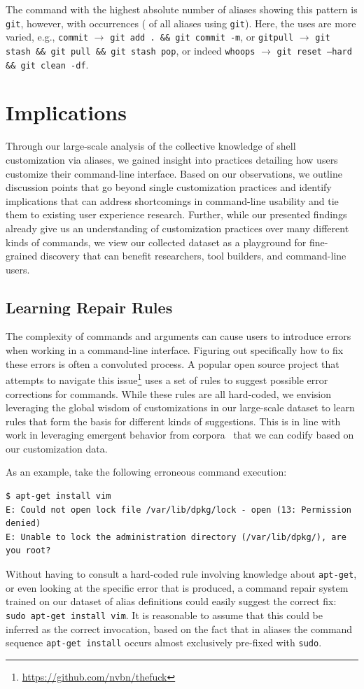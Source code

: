 \documentclass[smallextended,natbib]{svjour3}
\newcommand{\num}[1]{\numprint{#1}}
\newcommand{\per}[1]{\numprint[\%]{#1}}
\newcommand{\alias}[2]{{\texttt{#1} $\rightarrow$ \texttt{#2}}}
\newcommand{\cmd}[1]{{\texttt{#1}}}
\begin{document}
The command with the highest absolute number of aliases showing this pattern is \cmd{git}, however, with \num{12063} occurrences (\per{3.89} of all aliases using \cmd{git}).
Here, the uses are more varied, 
e.g., \alias{commit}{git add . \&\& git commit -m}, 
or \alias{gitpull}{git stash \&\& git pull \&\& git stash pop},
or indeed \alias{whoops}{git reset --hard \&\& git clean -df}.

\section{Implications}

Through our large-scale analysis of the collective knowledge of shell customization via aliases,
we gained insight into practices detailing how users customize their command-line interface.
Based on our observations, we outline discussion points that go beyond single customization practices and identify implications that can address shortcomings in command-line usability and tie them to existing user experience research.
Further, while our presented findings already give us an understanding of customization practices over many different kinds of commands, we view our collected dataset as a playground for fine-grained discovery that can benefit researchers, tool builders, and command-line users.

\subsection{Learning Repair Rules}
\label{sec:repair-rules}

The complexity of commands and arguments can cause users to introduce errors when working in a command-line interface.
Figuring out specifically how to fix these errors is often a convoluted process.
A popular open source project that attempts to navigate this issue\footnote{\url{https://github.com/nvbn/thefuck}} uses a set of rules to suggest possible error corrections for commands.
While these rules are all hard-coded, we envision leveraging the global wisdom of customizations in our large-scale dataset to learn rules that form the basis for different kinds of suggestions.
This is in line with work in leveraging emergent behavior from corpora~\citep{fast:14} that we can codify based on our customization data.

As an example, take the following erroneous command execution:
\begin{Verbatim}[breaklines=true]
$ apt-get install vim
E: Could not open lock file /var/lib/dpkg/lock - open (13: Permission denied)
E: Unable to lock the administration directory (/var/lib/dpkg/), are you root?
\end{Verbatim}
Without having to consult a hard-coded rule involving knowledge about \cmd{apt-get}, or even looking at the specific error that is produced, a command repair system trained on our dataset of alias definitions could easily suggest the correct fix: \texttt{sudo apt-get install vim}.
It is reasonable to assume that this could be inferred as the correct invocation, based on the fact that in aliases the command sequence \texttt{apt-get install} occurs almost exclusively pre-fixed with \cmd{sudo}.
\end{document}
